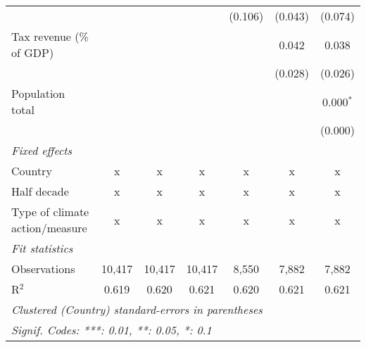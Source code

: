 \begin{tabular}{lcccccc}
                                                    &         &               &                & (0.106)        & (0.043)        & (0.074)\\   
   Tax revenue (\% of GDP)                          &         &               &                &                & 0.042          & 0.038\\   
                                                    &         &               &                &                & (0.028)        & (0.026)\\   
   Population total                                 &         &               &                &                &                & 0.000$^{*}$\\   
                                                    &         &               &                &                &                & (0.000)\\   
   \emph{Fixed effects}\\
   Country                                          & x       & x             & x              & x              & x              & x\\  
   Half decade                                      & x       & x             & x              & x              & x              & x\\  
   Type of climate action/measure                   & x       & x             & x              & x              & x              & x\\  
   \midrule \emph{Fit statistics}\\
   Observations                                     & 10,417  & 10,417        & 10,417         & 8,550          & 7,882          & 7,882\\  
   R$^2$                                            & 0.619   & 0.620         & 0.621          & 0.620          & 0.621          & 0.621\\  
   \midrule
   \multicolumn{7}{l}{\emph{Clustered (Country) standard-errors in parentheses}}\\
   \multicolumn{7}{l}{\emph{Signif. Codes: ***: 0.01, **: 0.05, *: 0.1}}\\
\end{tabular}
\par\endgroup


